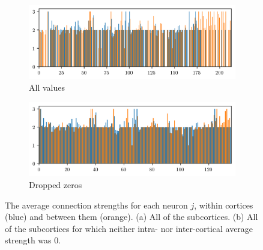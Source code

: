 \begin{figure}[ht]
  \centering
  \begin{subfigure}{0.45\textwidth}
    \centering
    \includegraphics[width=\textwidth]{figure/g_over_n}
    \caption{All values}
    \label{fig:g_over_n}
  \end{subfigure} %
  \begin{subfigure}{0.45\textwidth}
    \centering
    \includegraphics[width=\textwidth]{figure/g_over_n_drop}
    \caption{Dropped zeros}
    \label{fig:g_over_n_drop}
  \end{subfigure}
  \caption[Average strengths]{The average connection strengths for each neuron $j$, within cortices (blue) and between them (orange).
    (a) All of the subcortices.
    (b) All of the subcortices for which neither intra- nor inter-cortical average strength was 0.
  }
  \label{fig:average_strengths}
\end{figure}

